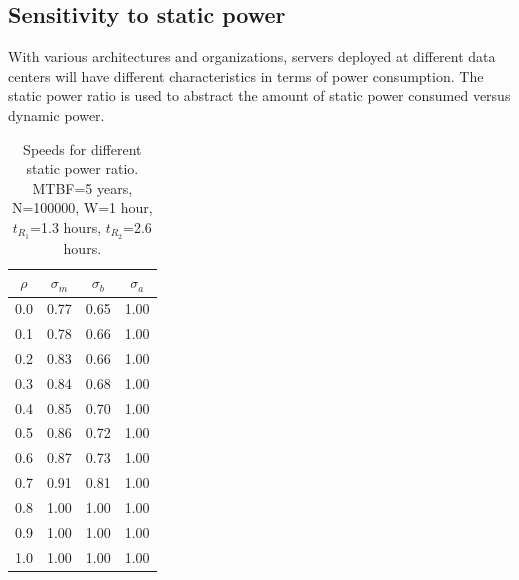
\subsection{Sensitivity to static power}

With various architectures and organizations, servers deployed at
different data centers will have different characteristics in terms of
power consumption. The static power ratio is used to abstract the
amount of static power consumed versus dynamic power.  %

%	
\begin{table}[!h]\small
	\caption{Speeds for different static power ratio. MTBF=5 years, N=100000, W=1 hour, $t_{R_1}$=1.3 hours, $t_{R_2}$=2.6 hours.}
	\centering
		\begin{tabular}{|c|c|c|c|}
		\hline
		$\rho$ & $\sigma_m$ & $\sigma_b$ & $\sigma_a$ \\
		\hline
		0.0 &	0.77 & 	0.65 & 	1.00 \\
		\hline 
		0.1 &	0.78 &	0.66 &	1.00 \\
		\hline
		0.2 &	0.83 &	0.66 &	1.00 \\
		\hline
		0.3	&   0.84 &	0.68 &	1.00 \\
		\hline
		0.4	&   0.85 &	0.70 &	1.00 \\
		\hline
		0.5	&   0.86 &	0.72 &	1.00 \\
		\hline
		0.6	&   0.87 &	0.73 &	1.00 \\
		\hline
		0.7	&	0.91 &	0.81 &	1.00 \\
		\hline
		0.8	& 	1.00 &	1.00 &	1.00 \\
		\hline
		0.9	&	1.00 &	1.00 &	1.00 \\
		\hline
		1.0	&	1.00 &	1.00 &	1.00 \\
		\hline
		\end{tabular}
	\label{tbl:rho}
\end{table}

